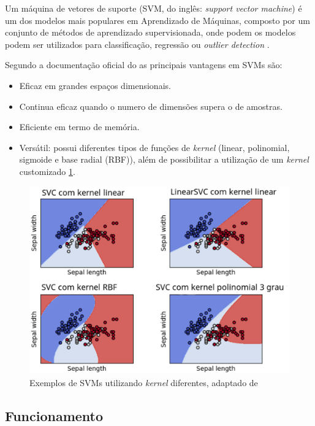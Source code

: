 Um máquina de vetores de suporte (SVM, do inglês: \textit{support vector machine}) é um dos modelos mais populares em Aprendizado de Máquinas, composto por um conjunto de métodos de aprendizado supervisionada, onde podem os modelos podem ser utilizados para classificação, regressão ou \textit{outlier detection} \cite{scikit-learn}.

Segundo a documentação oficial do  as principais vantagens em SVMs são:

\begin{itemize}
    \item Eficaz em grandes espaços dimensionais.
    \item Continua eficaz quando o numero de dimensões supera o de amostras.
    \item Eficiente em termo de memória.
    \item Versátil: possui diferentes tipos de funções de \textit{kernel} (linear, polinomial, sigmoide e base radial (RBF)), além de possibilitar a utilização de um \textit{kernel} customizado \ref{svmkernel}.
\end{itemize}

\begin{figure}[!htb]
    \centering
     \includegraphics[width=1\textwidth]{figuras/svmkernel.eps}
     \caption{Exemplos de SVMs utilizando \textit{kernel} diferentes, adaptado de }
     \label{svmkernel}
 \end{figure}

 \subsection{Funcionamento}

 